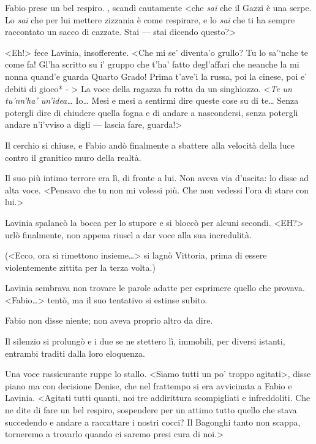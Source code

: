 Fabio prese un bel respiro. , scandì cautamente \textless{}che
\emph{sai} che il Gazzi è una serpe. Lo \emph{sai} che per lui mettere
zizzania è come respirare, e lo \emph{sai} che ti ha sempre raccontato
un sacco di cazzate. Stai --- stai dicendo questo?\textgreater{}

\textless{}Eh!\textgreater{} fece Lavinia, insofferente. \textless{}Che
mi se' diventa'o grullo? Tu lo sa'`nche te come fa! Gl'ha scritto su i'
gruppo che t'ha' fatto degl'affari che neanche la mi nonna quand'e
guarda Quarto Grado! Prima t'ave'i la russa, poi la cinese, poi e'
debiti di gioco* - \textgreater{} La voce della ragazza fu rotta da un
singhiozzo. \textless{}\emph{Te un tu'nn'ha' un'idea\ldots{}} Io\ldots{}
Mesi e mesi a sentirmi dire queste cose su di te\ldots{} Senza potergli
dire di chiudere quella fogna e di andare a nascondersi, senza potergli
andare n'i'vviso a digli --- lascia fare, guarda!\textgreater{}

Il cerchio si chiuse, e Fabio andò finalmente a sbattere alla velocità
della luce contro il granitico muro della realtà.

Il suo più intimo terrore era lì, di fronte a lui. Non aveva via
d'uscita: lo disse ad alta voce. \textless{}Pensavo che tu non mi
volessi più. Che non vedessi l'ora di stare con lui.\textgreater{}

Lavinia spalancò la bocca per lo stupore e si bloccò per alcuni secondi.
\textless{}EH?\textgreater{} urlò finalmente, non appena riuscì a dar
voce alla sua incredulità.

(\textless{}Ecco, ora si rimettono insieme\ldots{}\textgreater{} si
lagnò Vittoria, prima di essere violentemente zittita per la terza
volta.)

Lavinia sembrava non trovare le parole adatte per esprimere quello che
provava. \textless{}Fabio\ldots{}\textgreater{} tentò, ma il suo
tentativo si estinse subito.

Fabio non disse niente; non aveva proprio altro da dire.

Il silenzio si prolungò e i due se ne stettero lì, immobili, per diversi
istanti, entrambi traditi dalla loro eloquenza.

Una voce rassicurante ruppe lo stallo. \textless{}Siamo tutti un po'
troppo agitati\textgreater{}, disse piano ma con decisione Denise, che
nel frattempo si era avvicinata a Fabio e Lavinia. \textless{}Agitati
tutti quanti, noi tre addirittura scompigliati e infreddoliti. Che ne
dite di fare un bel respiro, sospendere per un attimo tutto quello che
stava succedendo e andare a raccattare i nostri cocci? Il Bagonghi tanto
non scappa, torneremo a trovarlo quando ci saremo presi cura di
noi.\textgreater{}

